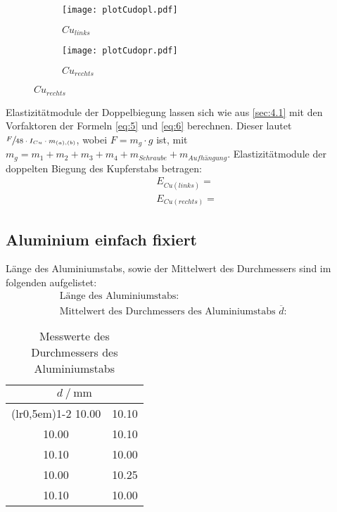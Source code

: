 \begin{figure}[H]
\caption{Graph für Doppelbiegung, $Cu_{links}$ und $Cu_{rechts}$}
\label{fig:2}
\begin{subfigure}{0.495\linewidth}
    \centering
    \texttt{[image: plotCudopl.pdf]}
    \caption{$Cu_{links}$}
    \label{fig:2a}
\end{subfigure}
\begin{subfigure}{0.495\linewidth}
    \centering
    \texttt{[image: plotCudopr.pdf]}
    \caption{$Cu_{rechts}$}
    \label{fig:2b}
\end{subfigure}
\end{figure}

\justifying Elastizitätmodule der Doppelbiegung lassen sich wie aus \ref{sec:4.1} mit den Vorfaktoren der Formeln \eqref{eq:5} und \eqref{eq:6}
berechnen. Dieser lautet $\sfrac{F}{48 \cdot I_{Cu} \cdot m_{(a),(b)}}$, wobei $F = m_g\cdot g$ ist, mit $m_g = m_1 + m_2 + m_3 + m_4 + m_{Schraube}
+ m_{Aufhängung}$.
\justifying Elastizitätmodule der doppelten Biegung des Kupferstabs betragen:
\begin{align}
    &E_{Cu(links)} = \text{} \label{eq:}\\
    &E_{Cu(rechts)} = \text{} \label{eq:}
\end{align}


\subsection{Aluminium einfach fixiert}\label{sec:4.3}

\justifying Länge des Aluminiumstabs, sowie der Mittelwert des Durchmessers sind im folgenden aufgelistet:
\begin{subequations}\label{eq:}
\begin{align}
    &\text{Länge des Aluminiumstabs:} \qquad &\text{} \label{eq:a}\\
    &\text{Mittelwert des Durchmessers des Aluminiumstabs $\overline{d}$:} \qquad &\text{} \label{eq:b}
\end{align}
\end{subequations}

\begin{table}[H]
\centering
    \begin{tabular}{c c}
    \toprule
        \multicolumn{2}{c}{$d \:/\: \si{\milli\meter}$}\\
        \cmidrule(lr{0,5em}){1-2}
        10.00 & 10.10\\
        10.00 & 10.10\\
        10.10 & 10.00\\
        10.00 & 10.25\\
        10.10 & 10.00\\
        \bottomrule
    \end{tabular}
\caption{Messwerte des Durchmessers des Aluminiumstabs}
\label{tab:4}
\end{table}

